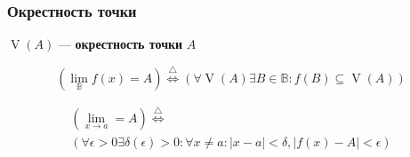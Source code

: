 \documentclass{article}
\DeclareMathOperator*{\V}{V}
\begin{document}
\subsubsection{Окрестность точки}

$\V(A)$ --- \textbf{окрестность точки} $A$

\[ (\lim_{\mathbb{B}} f(x) = A) \stackrel{\triangle}{\Leftrightarrow}
(\forall \V(A) \exists B \in \mathbb{B} : f(B) \subseteq \V(A)) \]

\begin{gather*}
	(\lim_{x \to a} = A) \stackrel{\triangle}{\Leftrightarrow} \\
	(\forall \epsilon > 0 \exists \delta(\epsilon) > 0 : \forall x \ne a : |x - a| < \delta, |f(x) - A| < \epsilon)
\end{gather*}
\end{document}
